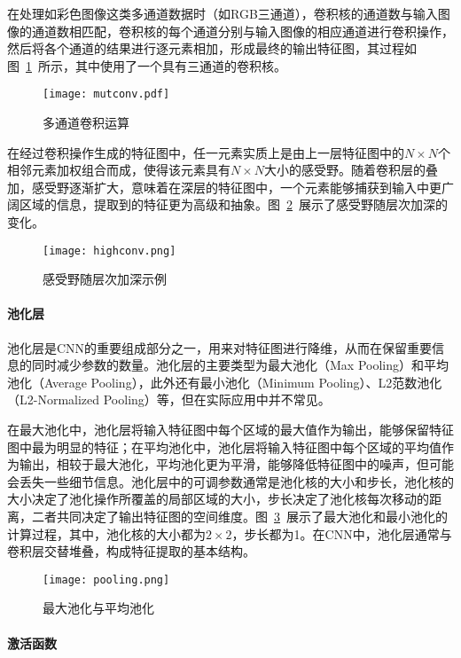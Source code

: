 在处理如彩色图像这类多通道数据时（如RGB三通道），卷积核的通道数与输入图像的通道数相匹配，卷积核的每个通道分别与输入图像的相应通道进行卷积操作，然后将各个通道的结果进行逐元素相加，形成最终的输出特征图，其过程如图~\ref{fig:mutconv}~所示，其中使用了一个具有三通道的卷积核。
\begin{figure}[ht]
    \centering
    \texttt{[image: mutconv.pdf]}
    \caption{多通道卷积运算}
    \label{fig:mutconv}
\end{figure}

在经过卷积操作生成的特征图中，任一元素实质上是由上一层特征图中的\(N \times N\)个相邻元素加权组合而成，使得该元素具有\(N \times N\)大小的感受野。随着卷积层的叠加，感受野逐渐扩大，意味着在深层的特征图中，一个元素能够捕获到输入中更广阔区域的信息，提取到的特征更为高级和抽象。图~\ref{fig:highconv}~展示了感受野随层次加深的变化。
\begin{figure}[ht]
    \centering
    \texttt{[image: highconv.png]}
    \caption{感受野随层次加深示例}
    \label{fig:highconv}
\end{figure}

\paragraph{池化层}

池化层是CNN的重要组成部分之一，用来对特征图进行降维，从而在保留重要信息的同时减少参数的数量。池化层的主要类型为最大池化（Max Pooling）和平均池化（Average Pooling），此外还有最小池化（Minimum Pooling）、L2范数池化（L2-Normalized Pooling）等，但在实际应用中并不常见。

在最大池化中，池化层将输入特征图中每个区域的最大值作为输出，能够保留特征图中最为明显的特征；在平均池化中，池化层将输入特征图中每个区域的平均值作为输出，相较于最大池化，平均池化更为平滑，能够降低特征图中的噪声，但可能会丢失一些细节信息。池化层中的可调参数通常是池化核的大小和步长，池化核的大小决定了池化操作所覆盖的局部区域的大小，步长决定了池化核每次移动的距离，二者共同决定了输出特征图的空间维度。图~\ref{fig:pooling}~展示了最大池化和最小池化的计算过程，其中，池化核的大小都为\(2\times2\)，步长都为1。在CNN中，池化层通常与卷积层交替堆叠，构成特征提取的基本结构。
\begin{figure}[ht]
    \centering
    \texttt{[image: pooling.png]}
    \caption{最大池化与平均池化}
    \label{fig:pooling}
\end{figure}

\paragraph{激活函数}


